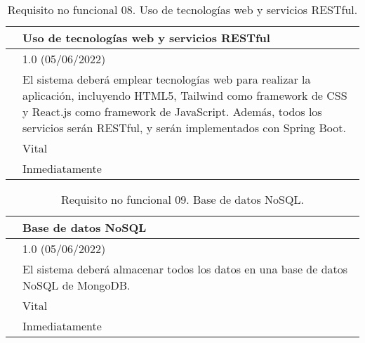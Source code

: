 \begin{table}[H]
\begin{center}
\begin{tabular}{|p{3cm}|p{10cm}|} \hline
\centering {\bf NFR-08} & Uso de tecnologías web y servicios RESTful  \\ \hline\hline
\centering {\bf Versión} & 1.0 (05/06/2022) \\ \hline
\centering {\bf Descripción} & El sistema deberá emplear tecnologías web para realizar la aplicación, incluyendo HTML5, Tailwind como framework de CSS y React.js como framework de JavaScript. Además, todos los servicios serán RESTful, y serán implementados con Spring Boot. \\ \hline
\centering {\bf Importancia} & Vital \\ \hline
\centering {\bf Urgencia} & Inmediatamente \\ \hline
\end{tabular}
\caption{Requisito no funcional 08. Uso de tecnologías web y servicios RESTful.}
\label{enlaceNFR8}
\end{center}
\end{table}

\begin{table}[H]
\begin{center}
\begin{tabular}{|p{3cm}|p{10cm}|} \hline
\centering {\bf NFR-09} & Base de datos NoSQL  \\ \hline\hline
\centering {\bf Versión} & 1.0 (05/06/2022) \\ \hline
\centering {\bf Descripción} & El sistema deberá almacenar todos los datos en una base de datos NoSQL de MongoDB. \\ \hline
\centering {\bf Importancia} & Vital \\ \hline
\centering {\bf Urgencia} & Inmediatamente \\ \hline
\end{tabular}
\caption{Requisito no funcional 09. Base de datos NoSQL.}
\label{enlaceNFR9}
\end{center}
\end{table}

